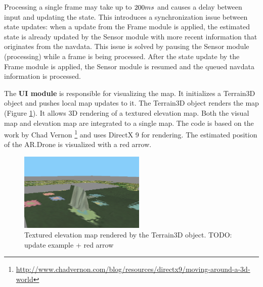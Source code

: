 Processing a single frame may take up to $200 \small{ms}$ and causes a delay between input and updating the state.
This introduces a synchronization issue between state updates: when a update from the Frame module is applied, the estimated state is already updated by the Sensor module with more recent information that originates from the navdata.
This issue is solved by pausing the Sensor module (processing) while a frame is being processed.
After the state update by the Frame module is applied, the Sensor module is resumed and the queued navdata information is processed.

The \textbf{UI module} is responsible for visualizing the map.
It initializes a Terrain3D object and pushes local map updates to it.
The Terrain3D object renders the map (Figure \ref{fig:terrain3d_map}).
It allows 3D rendering of a textured elevation map.
Both the visual map and elevation map are integrated to a single map.
The code is based on the work by Chad Vernon \footnote{\url{http://www.chadvernon.com/blog/resources/directx9/moving-around-a-3d-world}} and uses DirectX 9 for rendering.
The estimated position of the AR.Drone is visualized with a red arrow.
\begin{figure}[htb!]
\centering
\includegraphics[width=6cm]{images/3dterrain_map.png}
\caption{Textured elevation map rendered by the Terrain3D object. TODO: update example + red arrow} 
\label{fig:terrain3d_map}
\end{figure}
